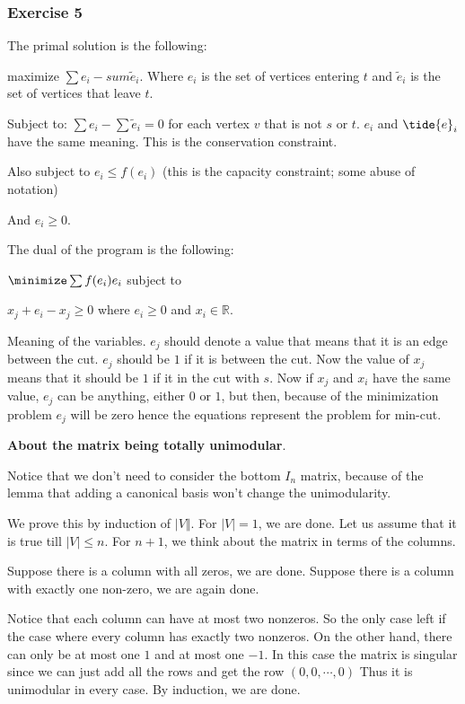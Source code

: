 \documentclass[11pt]{article}
\def\R{\mathbb{R}}
\begin{document}
\subsubsection{Exercise 5}
\label{sec:org5370d82}
The primal solution is the following:

maximize \(\sum e_i - sum \tilde{e}_i\). Where \(e_i\) is the set of vertices
entering \(t\) and \(\tilde{e}_i\) is the set of vertices that leave \(t\).

Subject to: \(\sum e_i - \sum \tilde{e}_i = 0\) for each vertex \(v\) that is
not \(s\) or \(t\). \(e_i\) and \(\tide{e}_i\) have the same meaning. This is the
conservation constraint.

Also subject to \(e_i \le f(e_i)\) (this is the capacity constraint; some
abuse of notation)

And \(e_i \ge 0\).

The dual of the program is the following:

\(\minimize \sum f(e_i) e_i\) subject to

\(x_j + e_i - x_j \ge 0\) where \(e_i \ge 0\) and \(x_i \in \R\).

Meaning of the variables. \(e_j\) should denote a value that means that it is
an edge between the cut. \(e_j\) should be \(1\) if it is between the cut. Now
the value of \(x_j\) means that it should be \(1\) if it in the cut with \(s\).
Now if \(x_j\) and \(x_i\) have the same value, \(e_j\) can be anything, either
\(0\) or \(1\), but then, because of the minimization problem \(e_j\) will be
zero hence the equations represent the problem for min-cut.

\textbf{About the matrix being totally unimodular}.

Notice that we don't need to consider the bottom \(I_n\) matrix, because of
the lemma that adding a canonical basis won't change the unimodularity.

We prove this by induction of \(\vert V \Vert\). For \(\vert V \vert = 1\), we
are done. Let us assume that it is true till \(\vert V \vert \le n\). For
\(n+1\), we think about the matrix in terms of the columns.

Suppose there is a column with all zeros, we are done. Suppose there is a
column with exactly one non-zero, we are again done.

Notice that each column can have at most two nonzeros. So the only case left
if the case where every column has exactly two nonzeros. On the other hand,
there can only be at most one \(1\) and at most one \(-1\). In this case the
matrix is singular since we can just add all the rows and get the row \((0,
    0, \cdots, 0)\) Thus it is unimodular in every case. By induction, we are
done.
\end{document}
